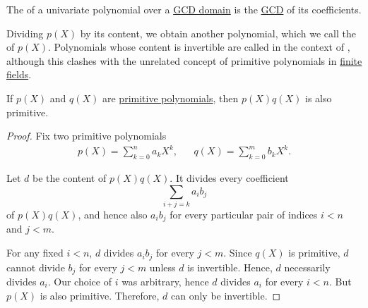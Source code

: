 \begin{definition}\label{def:polynomial_content}
  The  of a univariate polynomial over a \hyperref[def:gcd_domain]{GCD domain} is the \hyperref[def:gcd]{GCD} of its coefficients.

  Dividing \( p(X) \) by its content, we obtain another polynomial, which we call the  of \( p(X) \). Polynomials whose content is invertible are called  in the context of , although this clashes with the unrelated concept of primitive polynomials in \hyperref[thm:finite_fields]{finite fields}.
\end{definition}

\begin{lemma}\label{thm:gauss_lemma}
  If \( p(X) \) and \( q(X) \) are \hyperref[def:polynomial_content]{primitive polynomials}, then \( p(X) q(X) \) is also primitive.
\end{lemma}
\begin{proof}
  Fix two primitive polynomials
  \begin{align*}
    p(X) = \sum_{k=0}^n a_k X^k,
    &&
    q(X) = \sum_{k=0}^m b_k X^k.
  \end{align*}

  Let \( d \) be the content of \( p(X) q(X) \). It divides every coefficient
  \begin{equation*}
    \sum_{i+j=k} a_i b_j
  \end{equation*}
  of \( p(X) q(X) \), and hence also \( a_i b_j \) for every particular pair of indices \( i < n \) and \( j < m \).

  For any fixed \( i < n \), \( d \) divides \( a_i b_j \) for every \( j < m \). Since \( q(X) \) is primitive, \( d \) cannot divide \( b_j \) for every \( j < m \) unless \( d \) is invertible. Hence, \( d \) necessarily divides \( a_i \). Our choice of \( i \) was arbitrary, hence \( d \) divides \( a_i \) for every \( i < n \). But \( p(X) \) is also primitive. Therefore, \( d \) can only be invertible.
\end{proof}

